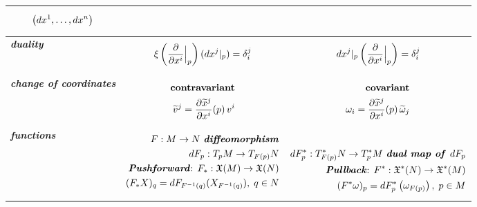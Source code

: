 \documentclass[11pt]{article}
\begin{document}
\begin{table}[h!]
\begin{tabularx}{1\textwidth} { 
  | >{\raggedright\arraybackslash} m{2cm}
  | >{\centering\arraybackslash}X
  | >{\centering\arraybackslash}X  | }
\begin{align*}
\left(dx^1, \ldots, dx^{n}\right)
\end{align*} \vspace{-1em}\\
\hline
\emph{\textbf{duality}} & 
\vspace{-1.25em}
\begin{align*}
\xi\left(\frac{\partial }{ \partial x^{i}}\Bigr|_{p}\right)(dx^{j}|_{p}) = \delta_{i}^{j}
\end{align*} \vspace{-1em} &
\vspace{-1.25em}
\begin{align*}
dx^{j}|_{p}\left(\frac{\partial }{ \partial x^{i}}\Bigr|_{p}\right) = \delta_{i}^{j}
\end{align*} \vspace{-1em} \\
\hline
\emph{\textbf{change of coordinates}} &
\vspace{-1.25em}
\begin{align*}
\text{\textbf{contravariant}}\\
\widetilde{v}^{j}= \frac{\partial \widetilde{x}^{j}}{ \partial x^{i}}(p)\, v^{i}
\end{align*}\vspace{-1em}
&
\vspace{-1.25em}
\begin{align*}
\text{\textbf{covariant}}\\
\omega_{i} = \frac{\partial \widetilde{x}^{j}}{ \partial x^{i}}(p)\,\widetilde{\omega}_{j}
\end{align*}\vspace{-1em}
\\
\hline
\emph{\textbf{functions}} &
\vspace{-1.25em}
\begin{align*}
F: M \rightarrow N\text{ \emph{\textbf{diffeomorphism}}}\\
dF_{p}: T_pM \rightarrow T_{F(p)}N \\
\text{\emph{\textbf{Pushforward}}: }F_{*}: \mathfrak{X}(M) \rightarrow \mathfrak{X}(N)  \\
(F_{*}X)_{q} = dF_{F^{-1}(q)}(X_{F^{-1}(q)}),\; q\in N
\end{align*}\vspace{-1em}
&
\vspace{-1.25em}
\begin{align*}
\\
dF_{p}^{*}:  T_{F(p)}^{*}N \rightarrow T_{p}^{*}M \text{ \emph{\textbf{dual map of }}}dF_p\\
\text{\emph{\textbf{Pullback}}: }F^{*}: \mathfrak{X}^{*}(N) \rightarrow \mathfrak{X}^{*}(M)\\
(F^{*}\omega)_p = dF_{p}^{*}\left(\omega_{F(p)}\right),\; p\in M
\end{align*} \vspace{-1em}
\\
\hline
\end{tabularx}
\end{table}

\newpage


\end{document}
